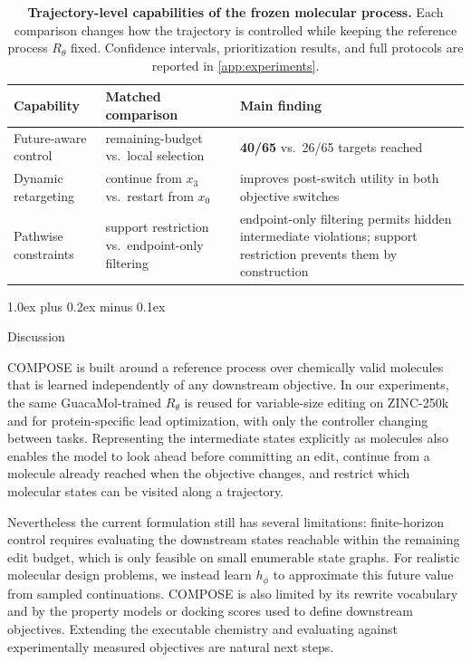 \documentclass{article}
\makeatletter
\theoremstyle{definition}
\theoremstyle{remark}
\def\section{\@startsection{section}{1}{\z@}{-1.4ex plus -0.4ex minus -.2ex}%
  {1.0ex plus 0.2ex minus 0.1ex}{\large\sc\raggedright}}
\makeatother
\begin{document}
\begin{table}[t]
\centering\small\setlength{\tabcolsep}{6pt}
\begin{tabular}{@{}p{} p{} p{}@{}}
\toprule
Capability & Matched comparison & Main finding \\
\midrule
Future-aware control & remaining-budget vs.\ local selection
  & \textbf{40/65} vs.\ 26/65 targets reached \\
\addlinespace[2pt]
Dynamic retargeting & continue from $x_3$ vs.\ restart from $x_0$
  & improves post-switch utility in both objective switches \\
\addlinespace[2pt]
Pathwise constraints & support restriction vs.\ endpoint-only filtering
  & endpoint-only filtering permits hidden intermediate violations; support
    restriction prevents them by construction \\
\bottomrule
\end{tabular}
\caption{\small\textbf{Trajectory-level capabilities of the frozen molecular
process.} Each comparison changes how the trajectory is controlled while keeping
the reference process $R_\theta$ fixed. Confidence intervals, prioritization
results, and full protocols are reported in \cref{app:experiments}.}
\label{tab:mechanism}%
\label{fig:mechanism}
\end{table}

\section{Discussion}
\label{sec:discussion}

COMPOSE is built around a reference process over chemically valid molecules that is learned independently of any
downstream objective. In our experiments, the same GuacaMol-trained $R_\theta$ is
reused for variable-size editing on ZINC-250k and for protein-specific lead
optimization, with only the controller changing between tasks. Representing the
intermediate states explicitly as molecules also enables the model to look ahead
before committing an edit, continue from a molecule already reached when the
objective changes, and restrict which molecular states can be visited along a
trajectory.

Nevertheless the current formulation still has several limitations: finite-horizon control requires evaluating the downstream states reachable within the remaining edit budget, which is only feasible on small enumerable state graphs. For realistic molecular design problems, we instead learn $h_\phi$ to approximate this future value from sampled continuations. COMPOSE is also limited by its rewrite vocabulary and by the property models or docking scores used to define downstream objectives. Extending the executable chemistry and evaluating against experimentally measured objectives are natural next steps.
\end{document}
